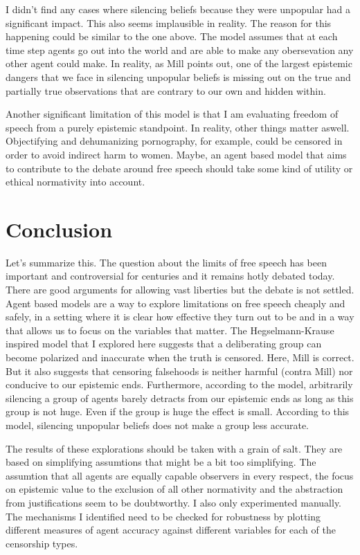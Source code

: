 \documentclass{essay-formal}
\begin{document}
I didn't find any cases where silencing beliefs because they were unpopular had a significant impact. This also seems implausible in reality. The reason for this happening could be similar to the one above. The model assumes that at each time step agents go out into the world and are able to make any obersevation any other agent could make. In reality, as Mill points out, one of the largest epistemic dangers that we face in silencing unpopular beliefs is missing out on the true and partially true observations that are contrary to our own and hidden within.

Another significant limitation of this model is that I am evaluating freedom of speech from a purely epistemic standpoint. In reality, other things matter aswell. Objectifying and dehumanizing pornography, for example, could be censored in order to avoid indirect harm to women. Maybe, an agent based model that aims to contribute to the debate around free speech should take some kind of utility or ethical normativity into account.

\section{Conclusion}

Let's summarize this. The question about the limits of free speech has been important and controversial for centuries and it remains hotly debated today. There are good arguments for allowing vast liberties but the debate is not settled. Agent based models are a way to explore limitations on free speech cheaply and safely, in a setting where it is clear how effective they turn out to be and in a way that allows us to focus on the variables that matter. The Hegselmann-Krause inspired model that I explored here suggests that a deliberating group can become polarized and inaccurate when the truth is censored. Here, Mill is correct. But it also suggests that censoring falsehoods is neither harmful (contra Mill) nor conducive to our epistemic ends. Furthermore, according to the model, arbitrarily silencing a group of agents barely detracts from our epistemic ends as long as this group is not huge. Even if the group is huge the effect is small. According to this model, silencing unpopular beliefs does not make a group less accurate.

The results of these explorations should be taken with a grain of salt. They are based on simplifying assumtions that might be a bit too simplifying. The assumtion that all agents are equally capable observers in every respect, the focus on epistemic value to the exclusion of all other normativity and the abstraction from justifications seem to be doubtworthy. I also only experimented manually. The mechanisms I identified need to be checked for robustness by plotting different measures of agent accuracy against different variables for each of the censorship types.
\end{document}
